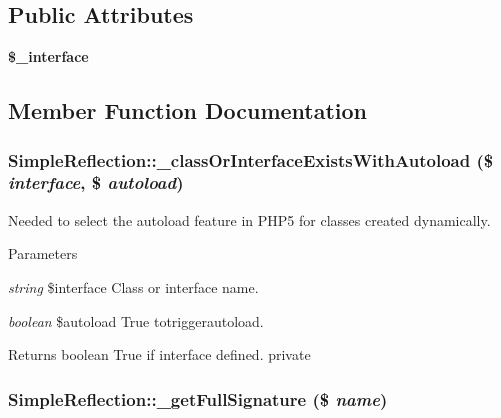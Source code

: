 \subsection*{Public Attributes}
\begin{DoxyCompactItemize}
\item 
\hypertarget{class_simple_reflection_a4f9fa8bfa4248a82c7a1cfd9c1b78f58}{
{\bfseries \$\_\-interface}}
\label{class_simple_reflection_a4f9fa8bfa4248a82c7a1cfd9c1b78f58}

\end{DoxyCompactItemize}


\subsection{Member Function Documentation}
\hypertarget{class_simple_reflection_ac2d030d93a1d5169d886e2bfe878fa01}{
\subsubsection[{\_\-classOrInterfaceExistsWithAutoload}]{\setlength{\rightskip}{0pt plus 5cm}SimpleReflection::\_\-classOrInterfaceExistsWithAutoload (\$ {\em interface}, \/  \$ {\em autoload})}}
\label{class_simple_reflection_ac2d030d93a1d5169d886e2bfe878fa01}
Needed to select the autoload feature in PHP5 for classes created dynamically. 
\begin{DoxyParams}{Parameters}
\item[{\em string}]\$interface Class or interface name. \item[{\em boolean}]\$autoload True totriggerautoload. \end{DoxyParams}
\begin{DoxyReturn}{Returns}
boolean True if interface defined.  private 
\end{DoxyReturn}
\hypertarget{class_simple_reflection_ab1cf79a333f164b0ddba43126b3f1c55}{
\subsubsection[{\_\-getFullSignature}]{\setlength{\rightskip}{0pt plus 5cm}SimpleReflection::\_\-getFullSignature (\$ {\em name})}}
